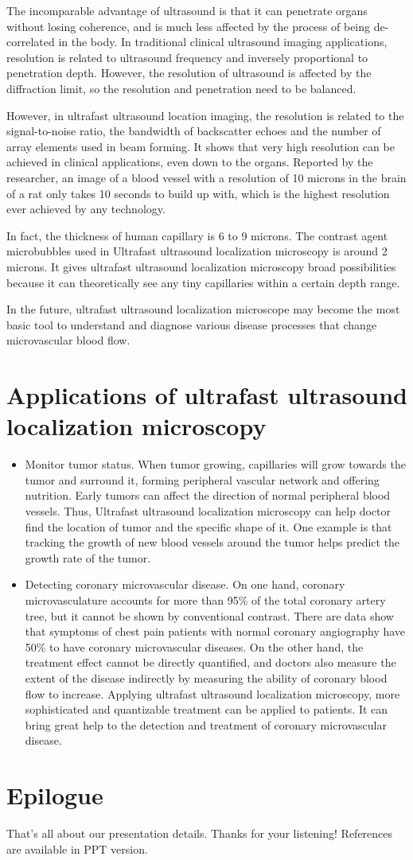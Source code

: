 \documentclass[paper=a4, fontsize=11pt]{scrartcl} %
\numberwithin{equation}{section} %
\numberwithin{figure}{section} %
\numberwithin{table}{section} %
\begin{document}
The incomparable advantage of ultrasound is that it can penetrate organs without losing coherence, and is much less affected by the process of being de-correlated in the body. In traditional clinical ultrasound imaging applications, resolution is related to ultrasound frequency and inversely proportional to penetration depth. However, the resolution of ultrasound is affected by the diffraction limit, so the resolution and penetration need to be balanced. 

However, in ultrafast ultrasound location imaging, the resolution is related to the signal-to-noise ratio, the bandwidth of backscatter echoes and the number of array elements used in beam forming. It shows that very high resolution can be achieved in clinical applications, even down to the organs. Reported by the researcher, an image of a blood vessel with a resolution of 10 microns in the brain of a rat only takes 10 seconds to build up with, which is the highest resolution ever achieved by any technology. 

In fact, the thickness of human capillary is 6 to 9 microns. The contrast agent microbubbles used in Ultrafast ultrasound localization microscopy is around 2 microns. It gives ultrafast ultrasound localization microscopy broad possibilities because it can theoretically see any tiny capillaries within a certain depth range. 

In the future, ultrafast ultrasound localization microscope may become the most basic tool to understand and diagnose various disease processes that change microvascular blood flow. 

\section{Applications of ultrafast ultrasound localization microscopy}
\begin{itemize}
\item Monitor tumor status. When tumor growing, capillaries will grow towards the tumor and surround it, forming peripheral vascular network and offering nutrition. Early tumors can affect the direction of normal peripheral blood vessels. Thus, Ultrafast ultrasound localization microscopy can help doctor find the location of tumor and the specific shape of it. One example is that tracking the growth of new blood vessels around the tumor helps predict the growth rate of the tumor.  
\item Detecting coronary microvascular disease. On one hand, coronary microvasculature accounts for more than 95\% of the total coronary artery tree, but it cannot be shown by conventional contrast. There are data show that symptoms of chest pain patients with normal coronary angiography have 50\% to have coronary microvascular diseases. On the other hand, the treatment effect cannot be directly quantified, and doctors also measure the extent of the disease indirectly by measuring the ability of coronary blood flow to increase. Applying ultrafast ultrasound localization microscopy, more sophisticated and quantizable treatment can be applied to patients. It can bring great help to the detection and treatment of coronary microvascular disease. 
\end{itemize}

\section{Epilogue}
That's all about our presentation details. Thanks for your listening! References are available in PPT version. 
\end{document}
